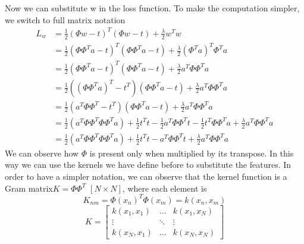 \documentclass[../main.tex]{subfiles}
\begin{document}
Now we can substitute w in the loss function. To make the computation simpler, we switch to full matrix notation
\begin{align*}
    L_w & = \frac{1}{2}(\Phi w - t)^T(\Phi w - t)+\frac{\lambda}{2}w^T w                                                                                                     \\
        & = \frac{1}{2}(\Phi \Phi^T a - t)^T(\Phi \Phi^T a - t)+\frac{\lambda}{2}(\Phi^T a)^T \Phi^T a                                                                       \\
        & = \frac{1}{2}(\Phi \Phi^T a - t)^T(\Phi \Phi^T a - t)+\frac{\lambda}{2} a^T \Phi \Phi^T a                                                                          \\
        & = \frac{1}{2}((\Phi \Phi^T a)^T - t^T)(\Phi \Phi^T a - t)+\frac{\lambda}{2} a^T \Phi \Phi^T a                                                                      \\
        & = \frac{1}{2}(a^T \Phi \Phi^T - t^T)(\Phi \Phi^T a - t)+\frac{\lambda}{2} a^T \Phi \Phi^T a                                                                        \\
        & = \frac{1}{2}(a^T \Phi \Phi^T \Phi \Phi^T a) + \frac{1}{2}t^T t -\frac{1}{2} a^T \Phi \Phi^T t -\frac{1}{2} t^T \Phi \Phi^T a +\frac{\lambda}{2} a^T \Phi \Phi^T a \\
        & = \frac{1}{2}(a^T \Phi \Phi^T \Phi \Phi^T a) + \frac{1}{2}t^T t - a^T \Phi \Phi^T t +\frac{\lambda}{2} a^T \Phi \Phi^T a
\end{align*}
We can observe how $\Phi$ is present only when multiplied by its transpose. In this way we can use the kernels we have define before to substitute the features. In order to have a simpler notation, we can observe that the kernel function is a Gram matrix\footnotemark $K=\Phi\Phi^T$ $[N \times N]$, where each element is
\begin{equation*}
    K_{nm} = \Phi(x_n)^T \Phi(x_m) = k(x_n,x_m)
\end{equation*}
\begin{equation}
    K =
    \begin{bmatrix}
        k(x_1,x_1) & \dots  & k(x_1,x_N) \\
        \vdots     & \ddots & \vdots     \\
        k(x_N,x_1) & \dots  & k(x_N,x_N)
    \end{bmatrix}
\end{equation}
\end{document}
